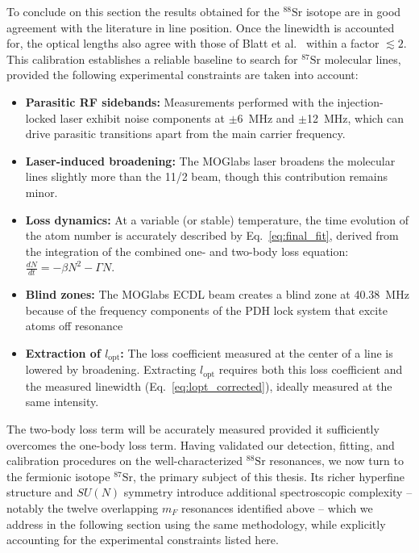 To conclude on this section the results obtained for the $^{88}\text{Sr}$ isotope are in good agreement with the
literature in line position. Once the linewidth is accounted for, the optical lengths also agree with those of Blatt et al.~\cite{blatt_systematic_2011} within a factor $\lesssim2$.
This calibration establishes a reliable baseline to search for $^{87}\text{Sr}$
molecular lines, provided the following experimental constraints are taken into
account:
\begin{itemize}
    \item \textbf{Parasitic RF sidebands:} Measurements performed with the injection-locked laser exhibit noise components at $\pm$6~MHz and $\pm$12~MHz, which can drive parasitic transitions apart from the main carrier 
    frequency.
    
    \item \textbf{Laser-induced broadening:} The MOGlabs laser broadens the molecular lines slightly more than the 11/2 beam, though this contribution remains minor.
    
    \item \textbf{Loss dynamics:} At a variable (or stable) temperature, the time evolution of the atom number is accurately described by Eq.~\ref{eq:final_fit}, derived from the integration of the combined one- 
    and two-body loss equation: $\frac{dN}{dt} = -\beta N^2 - \Gamma N$.

    \item \textbf{Blind zones:} The MOGlabs ECDL beam creates a blind zone at 40.38~MHz because of the frequency components of the PDH lock system that excite atoms off resonance 

    \item \textbf{Extraction of $l_{\text{opt}}$:} The loss coefficient measured at the center of a line is lowered by broadening. Extracting $l_{\text{opt}}$ requires both this loss coefficient and the measured linewidth (Eq.~\ref{eq:lopt_corrected}), ideally measured at the same intensity.
\end{itemize}

The two-body loss term will be accurately measured provided it sufficiently overcomes
the one-body loss term. Having validated our detection, fitting, and calibration
procedures on the well-characterized $^{88}\text{Sr}$ resonances, we now turn to the
fermionic isotope $^{87}\text{Sr}$, the primary subject of this thesis. Its richer
hyperfine structure and $SU(N)$ symmetry introduce additional spectroscopic complexity
-- notably the twelve overlapping $m_F$ resonances identified above -- which we address
in the following section using the same methodology, while explicitly accounting for
the experimental constraints listed here.

